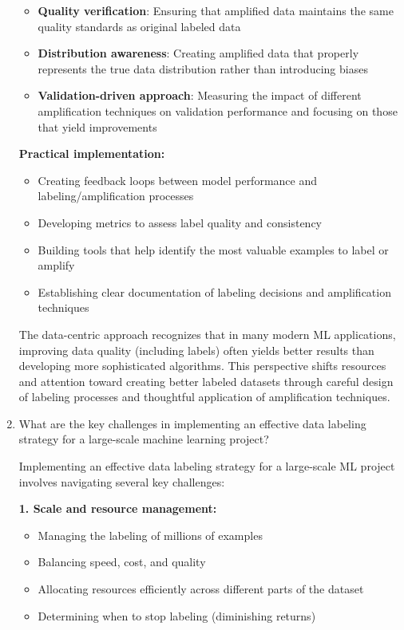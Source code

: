 \documentclass[12pt]{article}
\begin{document}
\begin{enumerate}
\begin{tcolorbox}[colback=blue!5!white,colframe=blue!75!black,title={Solution}]
\begin{itemize}
        \item \textbf{Quality verification}: Ensuring that amplified data maintains the same quality standards as original labeled data
        
        \item \textbf{Distribution awareness}: Creating amplified data that properly represents the true data distribution rather than introducing biases
        
        \item \textbf{Validation-driven approach}: Measuring the impact of different amplification techniques on validation performance and focusing on those that yield improvements
    \end{itemize}
    
    \textbf{Practical implementation:}
    \begin{itemize}
        \item Creating feedback loops between model performance and labeling/amplification processes
        \item Developing metrics to assess label quality and consistency
        \item Building tools that help identify the most valuable examples to label or amplify
        \item Establishing clear documentation of labeling decisions and amplification techniques
    \end{itemize}
    
    The data-centric approach recognizes that in many modern ML applications, improving data quality (including labels) often yields better results than developing more sophisticated algorithms. This perspective shifts resources and attention toward creating better labeled datasets through careful design of labeling processes and thoughtful application of amplification techniques.
    \end{tcolorbox}
    
    \item What are the key challenges in implementing an effective data labeling strategy for a large-scale machine learning project?
    
    \begin{tcolorbox}[colback=blue!5!white,colframe=blue!75!black,title={Solution}]
    Implementing an effective data labeling strategy for a large-scale ML project involves navigating several key challenges:
    
    \textbf{1. Scale and resource management:}
    \begin{itemize}
        \item Managing the labeling of millions of examples
        \item Balancing speed, cost, and quality
        \item Allocating resources efficiently across different parts of the dataset
        \item Determining when to stop labeling (diminishing returns)
    \end{itemize}
    

\end{tcolorbox}
\end{enumerate}
\end{document}
